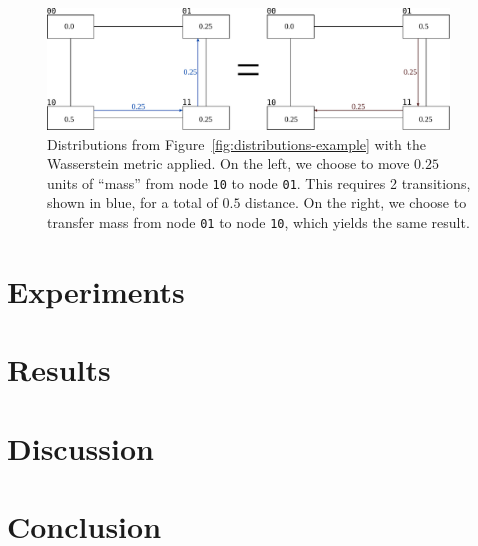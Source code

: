 \documentclass{article}
\begin{document}
\begin{figure}
  \begin{center}
    \includegraphics[width=0.95\textwidth]{figures/example-earthmovers.pdf}
  \end{center}
  \caption{Distributions from Figure~\ref{fig:distributions-example} with the Wasserstein metric applied. On the left,
    we choose to move $0.25$ units of ``mass'' from node \texttt{10} to node \texttt{01}. This requires 2 transitions, shown
  in blue, for a total of $0.5$ distance. On the right, we choose to transfer mass from node \texttt{01} to node
\texttt{10}, which yields the same result.}
  \label{fig:earthmovers-example}
\end{figure}


\section{Experiments}
\label{sec:experiments}

\section{Results}
\label{sec:results}

\section{Discussion}
\label{sec:discussion}

\section{Conclusion}
\label{sec:conclusion}



\end{document}
